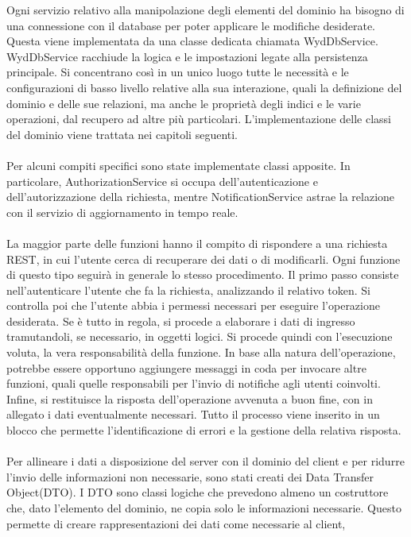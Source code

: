 Ogni servizio relativo alla manipolazione degli elementi del dominio
ha bisogno di una connessione con il database
per poter applicare le modifiche desiderate.
Questa viene implementata da una classe dedicata chiamata WydDbService.
WydDbService racchiude la logica
e le impostazioni legate alla persistenza principale.
Si concentrano così in un unico luogo tutte le necessità e
le configurazioni di basso livello relative alla sua interazione,
quali la definizione del dominio e delle sue relazioni,
ma anche le proprietà degli indici e le varie operazioni,
dal recupero ad altre più particolari.
L'implementazione delle classi del dominio viene trattata nei capitoli seguenti.\\
\\
Per alcuni compiti specifici sono state implementate classi apposite.
In particolare, 
AuthorizationService si occupa dell'autenticazione e dell'autorizzazione della richiesta,
mentre NotificationService astrae la relazione 
con il servizio di aggiornamento in tempo reale.\\
\\
La maggior parte delle funzioni hanno il compito di rispondere a una richiesta REST,
in cui l'utente cerca di recuperare dei dati o di modificarli.
Ogni funzione di questo tipo seguirà in generale lo stesso procedimento.
Il primo passo consiste nell'autenticare l'utente che fa la richiesta,
analizzando il relativo token.
Si controlla poi che l'utente abbia i permessi necessari
per eseguire l'operazione desiderata.
Se è tutto in regola, si procede a elaborare i dati di ingresso
tramutandoli, se necessario, in oggetti logici.
Si procede quindi con l'esecuzione voluta, la vera responsabilità della funzione.
In base alla natura dell'operazione,
potrebbe essere opportuno aggiungere messaggi in coda per invocare altre funzioni,
quali quelle responsabili per l'invio di notifiche agli utenti coinvolti.
Infine, si restituisce la risposta dell'operazione avvenuta a buon fine,
con in allegato i dati eventualmente necessari.
Tutto il processo viene inserito in un blocco che 
permette l'identificazione di errori e la gestione della relativa risposta.\\
\\
Per allineare i dati a disposizione del server con il dominio del client
e per ridurre l'invio delle informazioni non necessarie, sono stati creati dei Data Transfer Object(DTO).
I DTO sono classi logiche che prevedono almeno un costruttore che, dato l'elemento del dominio,
ne copia solo le informazioni necessarie.
Questo permette di creare rappresentazioni dei dati come necessarie al client,
